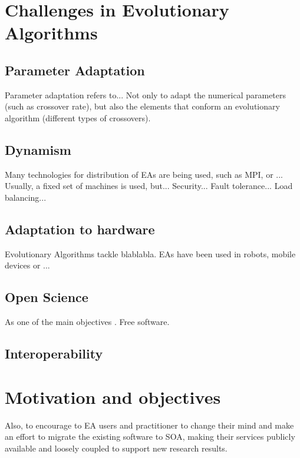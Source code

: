 \section{Challenges in Evolutionary Algorithms}
\label{sec:intro:challenges}



\subsection{Parameter Adaptation}

Parameter adaptation refers to... Not only to adapt the numerical parameters (such as crossover rate), but also the elements that conform an evolutionary algorithm (different types of crossovers).

\subsection{Dynamism}
Many technologies for distribution of EAs are being used, such as MPI, or ... Usually, a fixed set of machines is used, but... Security... Fault tolerance... Load balancing...


\subsection{Adaptation to hardware}
Evolutionary Algorithms tackle blablabla. EAs have been used in robots, mobile devices or ...

\subsection{Open Science} 
As one of the main objectives . Free software.

\subsection{Interoperability}








\section{Motivation and objectives}
\label{sec:intro:motivation}

Also, to encourage to EA users and practitioner to change their mind and make an effort to migrate the existing software to SOA, making their services publicly available and loosely coupled to support new research results.

